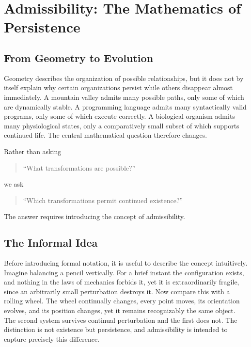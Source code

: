 \documentclass[11pt,oneside]{book}
\numberwithin{equation}{chapter}
\theoremstyle{definition}
\theoremstyle{plain}
\begin{document}
\chapter{Admissibility: The Mathematics of Persistence}

\section{From Geometry to Evolution}

Geometry describes the organization of possible relationships, but it does not by itself explain why certain organizations persist while others disappear almost immediately. A mountain valley admits many possible paths, only some of which are dynamically stable. A programming language admits many syntactically valid programs, only some of which execute correctly. A biological organism admits many physiological states, only a comparatively small subset of which supports continued life. The central mathematical question therefore changes.

Rather than asking

\begin{quote}
``What transformations are possible?''
\end{quote}

we ask

\begin{quote}
``Which transformations permit continued existence?''
\end{quote}

The answer requires introducing the concept of admissibility.

\section{The Informal Idea}

Before introducing formal notation, it is useful to describe the concept intuitively. Imagine balancing a pencil vertically. For a brief instant the configuration exists, and nothing in the laws of mechanics forbids it, yet it is extraordinarily fragile, since an arbitrarily small perturbation destroys it. Now compare this with a rolling wheel. The wheel continually changes, every point moves, its orientation evolves, and its position changes, yet it remains recognizably the same object. The second system survives continual perturbation and the first does not. The distinction is not existence but persistence, and admissibility is intended to capture precisely this difference.
\end{document}
